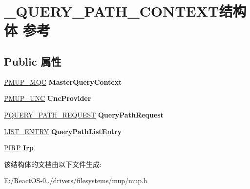 \hypertarget{struct___q_u_e_r_y___p_a_t_h___c_o_n_t_e_x_t}{}\section{\+\_\+\+Q\+U\+E\+R\+Y\+\_\+\+P\+A\+T\+H\+\_\+\+C\+O\+N\+T\+E\+X\+T结构体 参考}
\label{struct___q_u_e_r_y___p_a_t_h___c_o_n_t_e_x_t}
\subsection*{Public 属性}
\begin{DoxyCompactItemize}
\item 
\mbox{\label{struct___q_u_e_r_y___p_a_t_h___c_o_n_t_e_x_t_a264406ac0ed6a36263bed51f5843cc51}} 
\hyperlink{struct___m_u_p___m_q_c}{P\+M\+U\+P\+\_\+\+M\+QC} {\bfseries Master\+Query\+Context}
\item 
\mbox{\label{struct___q_u_e_r_y___p_a_t_h___c_o_n_t_e_x_t_a0a69fa2f6b81f7ad23119554e87380a9}} 
\hyperlink{struct___m_u_p___u_n_c}{P\+M\+U\+P\+\_\+\+U\+NC} {\bfseries Unc\+Provider}
\item 
\mbox{\label{struct___q_u_e_r_y___p_a_t_h___c_o_n_t_e_x_t_a4a863fe1b9d6e4c0ce119d39e7c7edc4}} 
\hyperlink{struct___q_u_e_r_y___p_a_t_h___r_e_q_u_e_s_t}{P\+Q\+U\+E\+R\+Y\+\_\+\+P\+A\+T\+H\+\_\+\+R\+E\+Q\+U\+E\+ST} {\bfseries Query\+Path\+Request}
\item 
\mbox{\label{struct___q_u_e_r_y___p_a_t_h___c_o_n_t_e_x_t_a8e6f894a488241452f050b4cb4550d37}} 
\hyperlink{struct___l_i_s_t___e_n_t_r_y}{L\+I\+S\+T\+\_\+\+E\+N\+T\+RY} {\bfseries Query\+Path\+List\+Entry}
\item 
\mbox{\label{struct___q_u_e_r_y___p_a_t_h___c_o_n_t_e_x_t_a148617405fd8b1fc720dd0137582cb61}} 
\hyperlink{interfacevoid}{P\+I\+RP} {\bfseries Irp}
\end{DoxyCompactItemize}


该结构体的文档由以下文件生成\+:\begin{DoxyCompactItemize}
\item 
E\+:/\+React\+O\+S-\/0../drivers/filesystems/mup/mup.\+h\end{DoxyCompactItemize}
